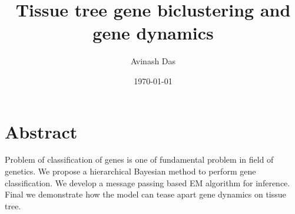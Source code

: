 \documentclass{article}
\title{
Tissue tree gene biclustering and gene dynamics
}
\author{Avinash Das}
\date{\today}
\begin{document}
\pagestyle{fancy}

\maketitle
\section{Abstract}
Problem of classification of genes is one of fundamental problem in field of genetics.
We propose a hierarchical  
Bayesian method to perform gene classification. We develop a message passing based 
EM  algorithm for inference. Final we demonstrate how the model can tease apart
gene dynamics on tissue tree. 



\end{document}
